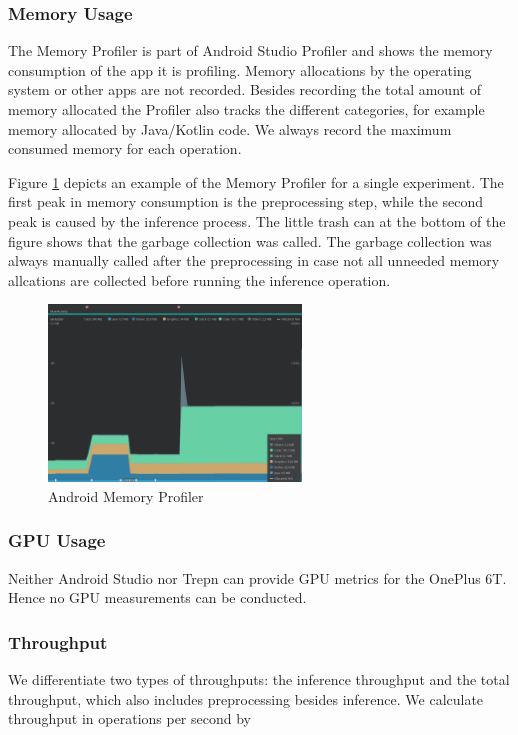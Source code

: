 \subsubsection{Memory Usage}
The Memory Profiler is part of Android Studio Profiler and shows the memory consumption of the app it is profiling. Memory allocations by the operating system or other apps are not recorded. Besides recording the total amount of memory allocated the Profiler also tracks the different categories, for example memory allocated by Java/Kotlin code. We always record the maximum consumed memory for each operation.

Figure \ref{fig:prof_mem} depicts an example of the Memory Profiler for a single experiment. The first peak in memory consumption is the preprocessing step, while the second peak is caused by the inference process.
The little trash can at the bottom of the figure shows that the garbage collection was called. The garbage collection was always manually called after the preprocessing in case not all unneeded memory allcations are collected before running the inference operation. 
\begin{figure}[H]
\centering
\includegraphics[width=0.6\textwidth]{./Bilder/profiler_MEM}
\caption{Android Memory Profiler}
\label{fig:prof_mem}
\end{figure}
\subsubsection{GPU Usage}
Neither Android Studio nor Trepn can provide GPU metrics for the OnePlus 6T. Hence no GPU measurements can be conducted.
\subsubsection{Throughput}
We differentiate two types of throughputs: the inference throughput and the total throughput, which also includes preprocessing besides inference.
We calculate throughput in operations per second by 

